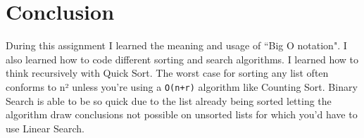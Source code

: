 \documentclass{article}
\begin{document}
    \section{Conclusion}
    During this assignment I learned the meaning and usage of ``Big O notation". I also learned how to code different sorting and search algorithms. I learned how to think recursively with
    Quick Sort. The worst case for sorting any list often conforms to n² unless you're using a \texttt{O(n+r)} algorithm like Counting Sort. Binary Search is able to be so quick due to the list
    already being sorted letting the algorithm draw conclusions not possible on unsorted lists for which you'd have to use Linear Search.
\end{document}
